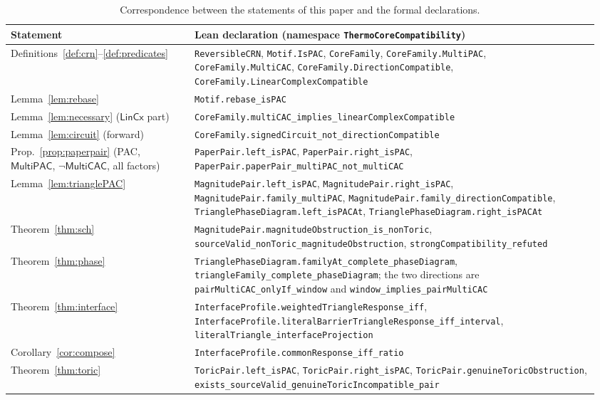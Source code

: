 \documentclass[11pt,a4paper]{article}
\theoremstyle{plain}
\theoremstyle{definition}
\theoremstyle{remark}
\newcommand{\MPAC}{\mathsf{MultiPAC}}
\newcommand{\MCAC}{\mathsf{MultiCAC}}
\newcommand{\LIN}{\mathsf{LinCx}}
\newcommand{\lean}[1]{\texttt{#1}}
\begin{document}
\begin{table}[t]
\centering
\small
\begin{tabular}{@{}>{\raggedright\arraybackslash}p{0.30\linewidth}>{\raggedright\arraybackslash}p{0.66\linewidth}@{}}
\toprule
Statement & Lean declaration (namespace \lean{ThermoCoreCompatibility}) \\
\midrule
Definitions~\ref{def:crn}--\ref{def:predicates} & \lean{ReversibleCRN}, \lean{Motif.IsPAC}, \lean{CoreFamily}, \lean{CoreFamily.MultiPAC}, \lean{CoreFamily.MultiCAC}, \lean{CoreFamily.\allowbreak DirectionCompatible}, \lean{CoreFamily.\allowbreak LinearComplexCompatible} \\
Lemma~\ref{lem:rebase} & \lean{Motif.rebase\_isPAC} \\
Lemma~\ref{lem:necessary} ($\LIN$ part) & \lean{CoreFamily.multiCAC\_\allowbreak implies\_\allowbreak linearComplexCompatible} \\
Lemma~\ref{lem:circuit} (forward) & \lean{CoreFamily.signedCircuit\_\allowbreak not\_\allowbreak directionCompatible} \\
Prop.~\ref{prop:paperpair} (PAC, $\MPAC$, $\neg\MCAC$, all factors) & \lean{PaperPair.left\_isPAC}, \lean{PaperPair.right\_isPAC}, \lean{PaperPair.paperPair\_\allowbreak multiPAC\_\allowbreak not\_\allowbreak multiCAC} \\
Lemma~\ref{lem:trianglePAC} & \lean{MagnitudePair.left\_isPAC}, \lean{MagnitudePair.right\_isPAC}, \lean{MagnitudePair.family\_multiPAC}, \lean{MagnitudePair.family\_\allowbreak directionCompatible}, \lean{TrianglePhaseDiagram.left\_isPACAt}, \lean{TrianglePhaseDiagram.right\_isPACAt} \\
Theorem~\ref{thm:sch} & \lean{MagnitudePair.magnitudeObstruction\_\allowbreak is\_\allowbreak nonToric}, \lean{sourceValid\_\allowbreak nonToric\_\allowbreak magnitudeObstruction}, \lean{strongCompatibility\_refuted} \\
Theorem~\ref{thm:phase} & \lean{TrianglePhaseDiagram.familyAt\_\allowbreak complete\_\allowbreak phaseDiagram}, \lean{triangleFamily\_\allowbreak complete\_\allowbreak phaseDiagram}; the two directions are \lean{pairMultiCAC\_\allowbreak onlyIf\_\allowbreak window} and \lean{window\_\allowbreak implies\_\allowbreak pairMultiCAC} \\
Theorem~\ref{thm:interface} & \lean{InterfaceProfile.\allowbreak weightedTriangleResponse\_iff}, \lean{InterfaceProfile.\allowbreak literalBarrierTriangleResponse\_\allowbreak iff\_\allowbreak interval}, \lean{literalTriangle\_\allowbreak interfaceProjection} \\
Corollary~\ref{cor:compose} & \lean{InterfaceProfile.\allowbreak commonResponse\_iff\_ratio} \\
Theorem~\ref{thm:toric} & \lean{ToricPair.left\_isPAC}, \lean{ToricPair.right\_isPAC}, \lean{ToricPair.\allowbreak genuineToricObstruction}, \lean{exists\_\allowbreak sourceValid\_\allowbreak genuineToricIncompatible\_\allowbreak pair} \\
\bottomrule
\end{tabular}
\caption{Correspondence between the statements of this paper and the formal declarations.}
\label{tab:lean}
\end{table}
\end{document}
